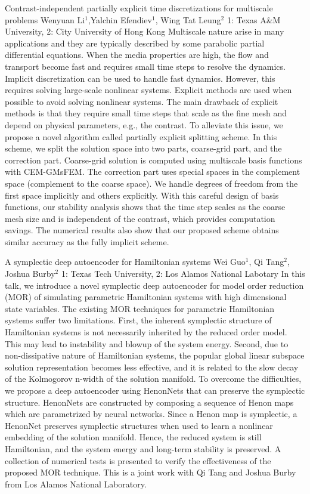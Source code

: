 \begin{addmargin}[2em]{0em}
\vspace{1.5ex}
\abs
{Contrast-independent partially explicit time discretizations for multiscale problems}
{Wenyuan Li$^{1}$,Yalchin Efendiev$^{1}$, Wing Tat Leung$^{2}$}
{1: Texas A\&M University, 2: City University of Hong Kong}
{Multiscale nature arise in many applications and they are typically described by some parabolic partial differential equations. When the media properties are high, the flow and transport become fast and requires small time steps to resolve the dynamics. Implicit
discretization
can be used to handle fast dynamics. However, this requires
solving large-scale nonlinear systems. Explicit methods
are used when possible to avoid solving nonlinear systems.
 The main drawback of explicit methods is that they
require small time steps that scale as the fine mesh and depend
on physical parameters, e.g., the contrast. To alleviate this issue,
we propose
a novel algorithm called partially explicit splitting scheme. In this scheme, we split the solution space into two parts, coarse-grid
part, and the correction part. Coarse-grid solution is computed using
multiscale basis functions with CEM-GMsFEM. The correction part
uses special spaces in the complement space (complement to the coarse space). We handle degrees of freedom from the first space implicitly and others explicitly. With this careful design of basis functions, our stability analysis shows that the time step scales as the coarse mesh size and is independent of the contrast, which provides computation savings. The numerical results also show that our proposed scheme obtains similar accuracy as the fully implicit scheme.}


\vspace{1.5ex}
\abs
{A symplectic deep autoencoder for Hamiltonian systems}
{Wei Guo$^{1}$, Qi Tang$^{2}$, Joshua Burby$^{2}$}
{1: Texas Tech University, 2: Los Alamos National Labotary}
{In this talk, we introduce a novel symplectic deep autoencoder for model order reduction (MOR) of simulating parametric Hamiltonian systems with high dimensional state variables. The existing MOR techniques for parametric Hamiltonian systems suffer two limitations. First, the inherent symplectic structure of Hamiltonian systems is not necessarily inherited by the reduced order model. This may lead to instability and blowup of the system energy. Second, due to non-dissipative nature of Hamiltonian systems, the popular global linear subspace solution representation becomes less effective, and it is related to the slow decay of the Kolmogorov n-width of the solution manifold. To overcome the difficulties, we propose a deep autoencoder using HenonNets that can preserve the symplectic structure. HenonNets are constructed by composing a sequence of Henon maps which are parametrized by neural networks. Since a Henon map is symplectic, a HenonNet preserves symplectic structures when used to learn a nonlinear embedding of the solution manifold. Hence, the reduced system is still Hamiltonian, and the system energy and long-term stability is preserved. A collection of numerical tests is presented to verify the effectiveness of the proposed MOR technique. This is a joint work with Qi Tang and Joshua Burby from Los Alamos National Laboratory.}



\end{addmargin}
